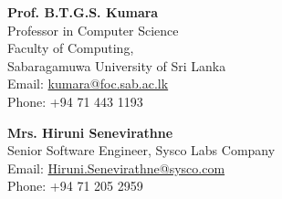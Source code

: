 \documentclass[letterpaper,11pt]{article}
\begin{document}
\begin{minipage}[t]{0.50\textwidth}
\textbf{Prof. B.T.G.S. Kumara}\\
Professor in Computer Science\\
Faculty of Computing,\\
Sabaragamuwa University of Sri Lanka\\
Email: \href{mailto:kumara@foc.sab.ac.lk}{kumara@foc.sab.ac.lk}\\
Phone: +94 71 443 1193
\end{minipage}
\hfill
\begin{minipage}[t]{0.46\textwidth}
\textbf{Mrs. Hiruni Senevirathne}\\
Senior Software Engineer, Sysco Labs Company\\
Email: \href{mailto:Hiruni.Senevirathne@sysco.com}{Hiruni.Senevirathne@sysco.com}\\
Phone: +94 71 205 2959
\end{minipage}
\end{document}
